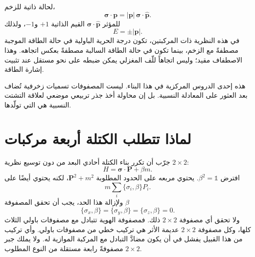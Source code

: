 لحالة ذاتية للزخم،
\begin{equation}
\boldsymbol{\sigma}\cdot\mathbf p
=
|\mathbf p|\,\boldsymbol{\sigma}\cdot\widehat{\mathbf p}.
\end{equation}
للمؤثر \(\boldsymbol{\sigma}\cdot\widehat{\mathbf p}\) القيم الذاتية \(+1\) و\(-1\)، ولذلك
\begin{equation}
E=\pm|\mathbf p|.
\end{equation}
في هذه النظرية ذات المركبتين، تكون درجة الحرية الباولية في حالة الطاقة الموجبة مصطفةً مع الزخم، بينما تكون في حالة الطاقة السالبة مصطفةً بعكس اتجاهه. وهذا الاصطفاف مقيد؛ وليس اتجاهاً للّف المغزلي يمكن ضبطه على نحو مستقل عند تثبيت إشارة الطاقة.

\begin{classroomqa}
\end{classroomqa}

هذه إحدى الدروس المركزية في هذا البناء. ليست المصفوفات تسميات زخرفية تُضاف بعد العثور على المعادلة النسبية. بل إن محاولة أخذ جذر تربيعي موضعي لعلاقة التشتت النسبية هي التي تولّدها.

\section{لماذا تتطلب الكتلة أربعة مركبات}

جرّب أن تكرر بناء الكتلة أحادي البعد من دون توسيع نظرية \(2\times2\):
\begin{equation}
H=\boldsymbol{\sigma}\cdot\mathbf P+\beta m.
\label{eq:l10-failed-mass}
\end{equation}
افترض \(\beta^2=\mathbb{1}\). يحتوي مربعه على الحدود المطلوبة \(\mathbf P^2+m^2\)، لكنه يحتوي أيضًا على
\begin{equation}
m\sum_i\{\sigma_i,\beta\}P_i.
\end{equation}
ولإزالة هذا الحد، يجب أن تحقق المصفوفة \(\beta\)
\begin{equation}
\{\sigma_x,\beta\}
=
\{\sigma_y,\beta\}
=
\{\sigma_z,\beta\}
=0.
\label{eq:l10-impossible-beta}
\end{equation}
ولا تحقق أي مصفوفة \(2\times2\) ذلك. فمصفوفة الهوية تتبادل مع مصفوفات باولي الثلاث كلها، وكل مصفوفة \(2\times2\) عديمة الأثر هي تركيب خطي من مصفوفات باولي. وأي تركيب من هذا القبيل يفشل في أن يكون مضادَّ التبادل مع المركبة الموازية له. ولا يملك جبر \(2\times2\) مصفوفةً رابعة مستقلة من النوع المطلوب.

